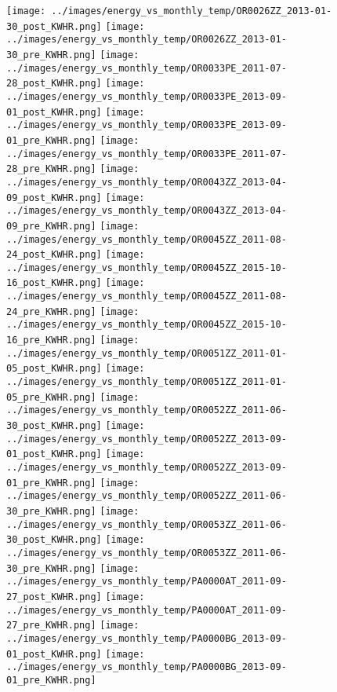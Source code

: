 \clearpage
\begin{figure}
\centering
\texttt{[image: ../images/energy\_vs\_monthly\_temp/OR0026ZZ\_2013-01-30\_post\_KWHR.png]}
\texttt{[image: ../images/energy\_vs\_monthly\_temp/OR0026ZZ\_2013-01-30\_pre\_KWHR.png]}
\texttt{[image: ../images/energy\_vs\_monthly\_temp/OR0033PE\_2011-07-28\_post\_KWHR.png]}
\texttt{[image: ../images/energy\_vs\_monthly\_temp/OR0033PE\_2013-09-01\_post\_KWHR.png]}
\texttt{[image: ../images/energy\_vs\_monthly\_temp/OR0033PE\_2013-09-01\_pre\_KWHR.png]}
\texttt{[image: ../images/energy\_vs\_monthly\_temp/OR0033PE\_2011-07-28\_pre\_KWHR.png]}
\texttt{[image: ../images/energy\_vs\_monthly\_temp/OR0043ZZ\_2013-04-09\_post\_KWHR.png]}
\texttt{[image: ../images/energy\_vs\_monthly\_temp/OR0043ZZ\_2013-04-09\_pre\_KWHR.png]}
\texttt{[image: ../images/energy\_vs\_monthly\_temp/OR0045ZZ\_2011-08-24\_post\_KWHR.png]}
\texttt{[image: ../images/energy\_vs\_monthly\_temp/OR0045ZZ\_2015-10-16\_post\_KWHR.png]}
\texttt{[image: ../images/energy\_vs\_monthly\_temp/OR0045ZZ\_2011-08-24\_pre\_KWHR.png]}
\texttt{[image: ../images/energy\_vs\_monthly\_temp/OR0045ZZ\_2015-10-16\_pre\_KWHR.png]}
\texttt{[image: ../images/energy\_vs\_monthly\_temp/OR0051ZZ\_2011-01-05\_post\_KWHR.png]}
\texttt{[image: ../images/energy\_vs\_monthly\_temp/OR0051ZZ\_2011-01-05\_pre\_KWHR.png]}
\texttt{[image: ../images/energy\_vs\_monthly\_temp/OR0052ZZ\_2011-06-30\_post\_KWHR.png]}
\texttt{[image: ../images/energy\_vs\_monthly\_temp/OR0052ZZ\_2013-09-01\_post\_KWHR.png]}
\texttt{[image: ../images/energy\_vs\_monthly\_temp/OR0052ZZ\_2013-09-01\_pre\_KWHR.png]}
\texttt{[image: ../images/energy\_vs\_monthly\_temp/OR0052ZZ\_2011-06-30\_pre\_KWHR.png]}
\texttt{[image: ../images/energy\_vs\_monthly\_temp/OR0053ZZ\_2011-06-30\_post\_KWHR.png]}
\texttt{[image: ../images/energy\_vs\_monthly\_temp/OR0053ZZ\_2011-06-30\_pre\_KWHR.png]}
\texttt{[image: ../images/energy\_vs\_monthly\_temp/PA0000AT\_2011-09-27\_post\_KWHR.png]}
\texttt{[image: ../images/energy\_vs\_monthly\_temp/PA0000AT\_2011-09-27\_pre\_KWHR.png]}
\texttt{[image: ../images/energy\_vs\_monthly\_temp/PA0000BG\_2013-09-01\_post\_KWHR.png]}
\texttt{[image: ../images/energy\_vs\_monthly\_temp/PA0000BG\_2013-09-01\_pre\_KWHR.png]}
\end{figure}
